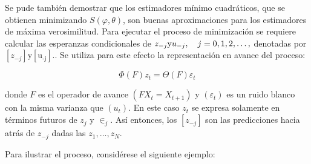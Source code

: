 Se pude tambi\'{e}n demostrar que los estimadores m\'{i}nimo cuadr\'{a}ticos, que se obtienen minimizando $S\left( {\varphi ,\theta } \right)$, son buenas aproximaciones para los estimadores de m\'{a}xima verosimilitud. Para ejecutar el proceso de minimizaci\'{o}n se requiere calcular las esperanzas condicionales de $z_{-j} \text{y}u_{-j} ,\quad j=0,1,2,\mathellipsis ,$ denotadas por $\left[ {z_{-j} } \right]\text{y}\left[ {\text{u}_{\text{-j}} } \right].$. Se utiliza para este efecto la representaci\'{o}n en avance del proceso:

\[
\Phi \left( F \right)z_{t} =\Theta \left( F \right)\varepsilon_{t} 
\]

donde $F$ es el operador de avance $\left( {FX_{t} =X_{t+1} } \right)$ y $\left( {\varepsilon_{t} } \right)$ es un ruido blanco con la misma varianza que $\left( {u_{t} } \right).$ En este caso $z_{t} $ se expresa solamente en t\'{e}rminos futuros de $z_{j}$ y $\in_{j} $. As\'{i} entonces, los $\left[ {z_{-j} } \right]$ son las predicciones hacia atr\'{a}s de $z_{-j} $ dadas las $z_{1} ,\ldots ,z_{N}$.\newline

Para ilustrar el proceso, consid\'{e}rese el siguiente ejemplo:

